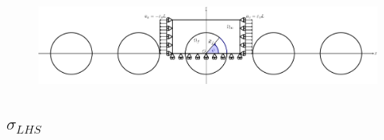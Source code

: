\documentclass[first,firstsupp,lastsupp,last,hyperref,table]{ETHclass}
\begin{document}
\begin{frame}
\begin{columns}[c]
\begin{column}{0.5\textwidth}
\end{column}
\end{columns}
\vspace{-0.4cm}
\centering
\begin{figure}
\centering
\includegraphics[width=\textwidth]{refAngle.pdf}
\end{figure}
\end{frame}

\subsection{$\sigma_{LHS}$}
\end{document}
